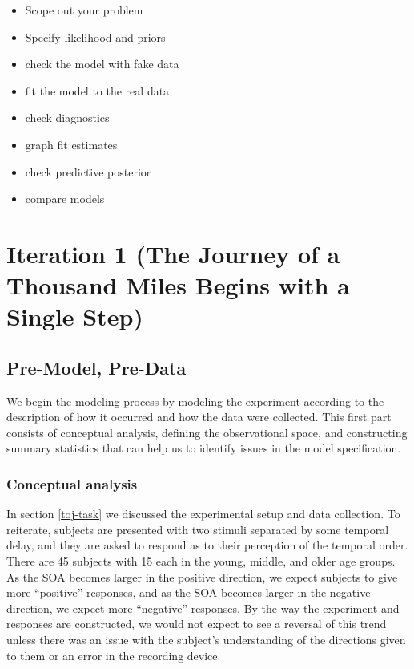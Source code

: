 \documentclass[11pt, oneside, openany]{scrbook}
\providecommand{\tightlist}{%
  \setlength{\itemsep}{0pt}\setlength{\parskip}{0pt}}
\begin{document}
\begin{itemize}
\tightlist
\item
  Scope out your problem
\item
  Specify likelihood and priors
\item
  check the model with fake data
\item
  fit the model to the real data
\item
  check diagnostics
\item
  graph fit estimates
\item
  check predictive posterior
\item
  compare models
\end{itemize}

\hypertarget{iter1}{%
\section{Iteration 1 (The Journey of a Thousand Miles Begins with a Single Step)}\label{iter1}}

\hypertarget{pre-model-pre-data}{%
\subsection{Pre-Model, Pre-Data}\label{pre-model-pre-data}}

We begin the modeling process by modeling the experiment according to the description of how it occurred and how the data were collected. This first part consists of conceptual analysis, defining the observational space, and constructing summary statistics that can help us to identify issues in the model specification.

\hypertarget{iter1-concept}{%
\subsubsection{Conceptual analysis}\label{iter1-concept}}

In section \ref{toj-task} we discussed the experimental setup and data collection. To reiterate, subjects are presented with two stimuli separated by some temporal delay, and they are asked to respond as to their perception of the temporal order. There are 45 subjects with 15 each in the young, middle, and older age groups. As the SOA becomes larger in the positive direction, we expect subjects to give more ``positive'' responses, and as the SOA becomes larger in the negative direction, we expect more ``negative'' responses. By the way the experiment and responses are constructed, we would not expect to see a reversal of this trend unless there was an issue with the subject's understanding of the directions given to them or an error in the recording device.
\end{document}
